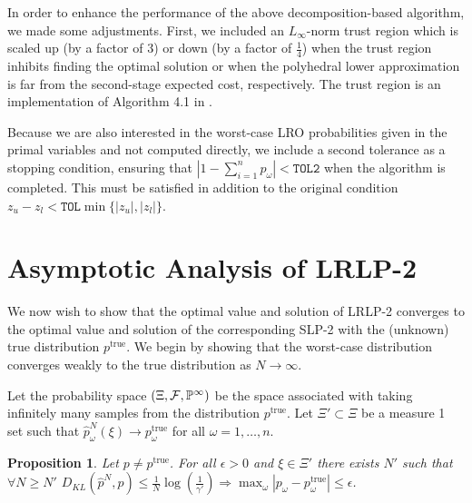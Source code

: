 \documentclass[11pt]{article}
\renewcommand{\P}{\mathbb{P}}
\newcommand{\ptrue}{p^{\text{true}}}
\newtheorem{proposition}[theorem]{Proposition}
\begin{document}
In order to enhance the performance of the above decomposition-based algorithm, we made some adjustments.
First, we included an $L_\infty$-norm trust region which is scaled up (by a factor of $3$) or down (by a factor of $\tfrac{1}{4}$) when the trust region inhibits finding the optimal solution or when the polyhedral lower approximation is far from the second-stage expected cost, respectively.
The trust region is an implementation of Algorithm 4.1 in \cite{nocedal1999numerical}.

Because we are also interested in the worst-case LRO probabilities given in the primal variables and not computed directly, we include a second tolerance as a stopping condition, ensuring that $\left| 1 - \sum_{i=1}^n p_\omega \right| < \texttt{TOL2}$ when the algorithm is completed.
This must be satisfied in addition to the original condition $z_u - z_l < \texttt{TOL}\min\{|z_u|,|z_l|\}$.

\section{Asymptotic Analysis of LRLP-2}

We now wish to show that the optimal value and solution of LRLP-2 converges to the optimal value and solution of the corresponding SLP-2 with the (unknown) true distribution $\ptrue$.
We begin by showing that the worst-case distribution converges weakly to the true distribution as $N \rightarrow \infty$.

Let the probability space $(\Xi,{\cal F},\P^\infty)$ be the space associated with taking infinitely many samples from the distribution $\ptrue$.
Let $\Xi' \subset \Xi$ be a measure 1 set such that $\hat{p}^N_\omega(\xi) \rightarrow \ptrue_\omega$ for all $\omega = 1, \dots, n$.

\begin{proposition} \label{prop:weak_conv}
	Let $p \neq \ptrue$.  For all $\epsilon > 0$ and $\xi \in \Xi'$ there exists $N'$ such that $\forall N \geq N'$ $D_{KL}(\hat{p}^N,p) \leq \frac{1}{N} \log\left(\frac{1}{\gamma'}\right) \Rightarrow \max_\omega |p_\omega - \ptrue_\omega| \leq \epsilon$.
\end{proposition}
\end{document}
